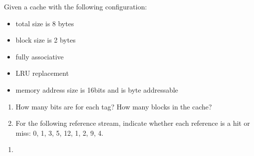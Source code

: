 \begin{problem}
  Given a cache with the following configuration:
  \begin{itemize}
    \item total size is 8 bytes
    \item block size is 2 bytes
    \item fully associative
    \item LRU replacement
    \item memory address size is 16bits and is byte addressable
  \end{itemize}
  \begin{enumerate}
    \item How many bits are for each tag? How many blocks in the cache?
    \item For the following reference stream, indicate whether each reference is a hit or miss: 0, 1, 3, 5, 12, 1, 2, 9, 4.
  \end{enumerate}
\end{problem}
\begin{answer}
  \begin{enumerate}
    \item 
  \end{enumerate}
\end{answer}
